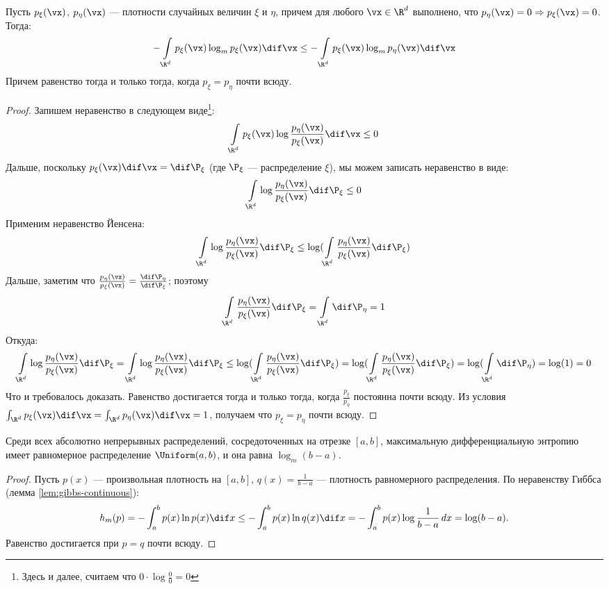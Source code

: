 \begin{Lemma}
	\label{lem:gibbs-continuous}
	Пусть $p_{\xi}(\vx)$, $p_{\eta}(\vx)$ --- плотности случайных величин $\xi$ и $\eta$, причем для любого $\vx \in \R^d$ выполнено, что $p_{\eta}(\vx) = 0 \Rightarrow p_{\xi}(\vx) = 0$. Тогда:
	\[
		-\int\limits_{\R^d} p_{\xi}(\vx)\log_m p_{\xi}(\vx)\dif\vx \leq -\int\limits_{\R^d}p_{\xi}(\vx)\log_m p_{\eta}(\vx)\dif\vx
	\]
	Причем равенство тогда и только тогда, когда $p_{\xi} = p_{\eta}$ почти всюду.
\end{Lemma}
\begin{proof}
	Запишем неравенство в следующем виде\footnote{Здесь и далее, считаем что $0 \cdot \log \frac{0}{0} = 0$}:
	\[
		\int\limits_{\R^d} p_{\xi}(\vx)\log \frac{p_{\eta}(\vx)}{p_{\xi}(\vx)}\dif\vx \leq 0
	\]
	Дальше, поскольку $p_{\xi}(\vx)\dif\vx = \dif \P_{\xi}$ (где $\P_{\xi}$ --- распределение $\xi$), мы можем записать неравенство в виде:
	\[
		\int\limits_{\R^d}\log \frac{p_{\eta}(\vx)}{p_{\xi}(\vx)}\dif\P_{\xi} \leq 0
	\]
	Применим неравенство Йенсена:
	\[
		\int\limits_{\R^d}\log \frac{p_{\eta}(\vx)}{p_{\xi}(\vx)}\dif\P_{\xi} \leq 	\log(\int\limits_{\R^d}\frac{p_{\eta}(\vx)}{p_{\xi}(\vx)}\dif\P_{\xi})
	\]
	Дальше, заметим что $\frac{p_{\eta}(\vx)}{p_{\xi}(\vx)} = \frac{\dif\P_{\eta}}{\dif\P_{\xi}}$; поэтому
	\[
		\int\limits_{\R^d}\frac{p_{\eta}(\vx)}{p_{\xi}(\vx)}\dif\P_{\xi} =  \int\limits_{\R^d}\dif\P_{\eta} = 1
	\]
	Откуда:
	\[
		\int\limits_{\R^d}\log \frac{p_{\eta}(\vx)}{p_{\xi}(\vx)}\dif\P_{\xi} 
		= \int\limits_{\R^d}\log \frac{p_{\eta}(\vx)}{p_{\xi}(\vx)}\dif\P_{\xi} 
		\leq \log(\int\limits_{\R^d}\frac{p_{\eta}(\vx)}{p_{\xi}(\vx)}\dif\P_{\xi})
		= \log(\int\limits_{\R^d}\frac{p_{\eta}(\vx)}{p_{\xi}(\vx)}\dif\P_{\xi})
		= \log(\int\limits_{\R^d}\dif\P_{\eta})
		= \log(1)
		= 0
	\]
	Что и требовалось доказать. Равенство достигается тогда и только тогда, когда $\frac{p_{\xi}}{p_{\eta}}$ постоянна почти всюду. Из условия $\int_{\R^d}p_{\xi}(\vx)\dif\vx = \int_{\R^d}p_{\eta}(\vx)\dif\vx = 1$, получаем что $p_\xi = p_{\eta}$ почти всюду.
\end{proof}
\begin{corollary}
	Среди всех абсолютно непрерывных распределений, сосредоточенных на отрезке $[a,b]$, максимальную дифференциальную энтропию имеет равномерное распределение $\Uniform(a,b)$, и она равна $\log_m(b-a)$.
\end{corollary}
\begin{proof}
	Пусть $p(x)$ --- произвольная плотность на $[a,b]$, $q(x) = \frac{1}{b-a}$ — плотность равномерного распределения. По неравенству Гиббса (лемма \ref{lem:gibbs-continuous}):
	\[
		h_m(p) = -\int_a^b p(x)\ln p(x)\dif x \leq -\int_a^b p(x)\ln q(x)\dif x = -\int_a^b p(x)\log\frac{1}{b-a}\,dx = \log(b-a).
	\]
	Равенство достигается при $p = q$ почти всюду.
\end{proof}

